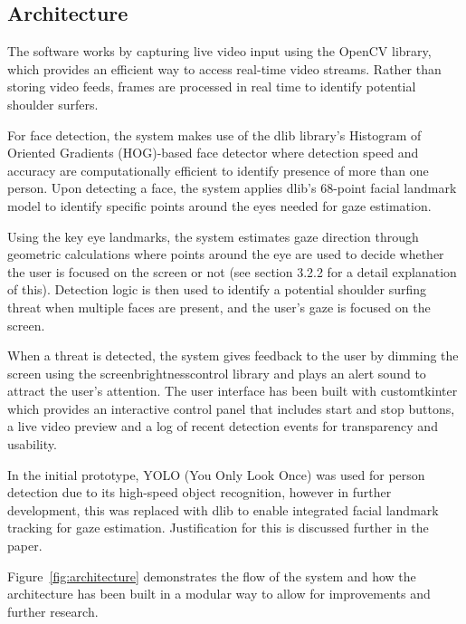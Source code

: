 \documentclass[12pt]{article}
\theoremstyle{plain}
\theoremstyle{definition}
\begin{document}
\subsection{Architecture}
\label{Architecture}

The software works by capturing live video input using the OpenCV library, which provides an efficient way to access real-time video streams. Rather than storing video feeds, frames are processed in real time to identify potential shoulder surfers.

For face detection, the system makes use of the dlib library’s Histogram of Oriented Gradients (HOG)-based face detector where detection speed and accuracy are computationally efficient to identify presence of more than one person. Upon detecting a face, the system applies dlib’s 68-point facial landmark model to identify specific points around the eyes needed for gaze estimation. 

Using the key eye landmarks, the system estimates gaze direction through geometric calculations where points around the eye are used to decide whether the user is focused on the screen or not (see section 3.2.2 for a detail explanation of this). Detection logic is then used to identify a potential shoulder surfing threat when multiple faces are present, and the user’s gaze is focused on the screen.

When a threat is detected, the system gives feedback to the user by dimming the screen using the screen\textunderscore brightness\textunderscore control library and plays an alert sound to attract the user’s attention. The user interface has been built with customtkinter which provides an interactive control panel that includes start and stop buttons, a live video preview and a log of recent detection events for transparency and usability. 

In the initial prototype, YOLO (You Only Look Once) was used for person detection due to its high-speed object recognition, however in further development, this was replaced with dlib to enable integrated facial landmark tracking for gaze estimation. Justification for this is discussed further in the paper.

Figure~\ref{fig:architecture} demonstrates the flow of the system and how the architecture has been built in a modular way to allow for improvements and further research.
\end{document}
